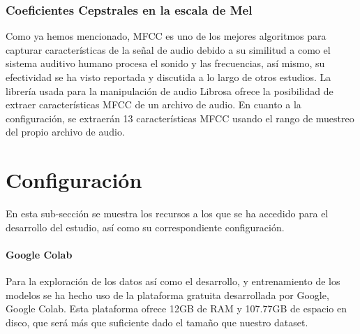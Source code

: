 \documentclass[11pt,a4paper,spanish]{book}
\begin{document}
	\subsubsection{Coeficientes Cepstrales en la escala de Mel}
	Como ya hemos mencionado, MFCC es uno de los mejores algoritmos para capturar características de la señal de audio debido a su similitud a como el sistema auditivo humano procesa el sonido y las frecuencias, así mismo, su efectividad se ha visto reportada y discutida a lo largo de otros estudios.
	La librería usada para la manipulación de audio Librosa ofrece la posibilidad de extraer características MFCC de un archivo de audio. En cuanto a la configuración, se extraerán 13 características MFCC usando el rango de muestreo del propio archivo de audio.
	

	

	\section{Configuración}
	En esta sub-sección se muestra los recursos a los que se ha accedido para el desarrollo del estudio, así como su correspondiente configuración.

	
	
	\paragraph{Google Colab} Para la exploración de los datos así como el desarrollo, y entrenamiento de los modelos se ha hecho uso de la plataforma gratuita desarrollada por Google, Google Colab. Esta plataforma ofrece 12GB de RAM  y 107.77GB de espacio en disco, que será más que suficiente dado el tamaño que nuestro dataset.
	
\end{document}
